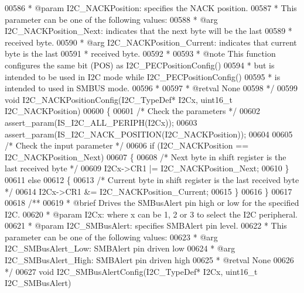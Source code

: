 \begin{DoxyCode}
00586 \textcolor{comment}{  * @param  I2C\_NACKPosition: specifies the NACK position. }
00587 \textcolor{comment}{  *          This parameter can be one of the following values:}
00588 \textcolor{comment}{  *            @arg I2C\_NACKPosition\_Next: indicates that the next byte will be the last}
00589 \textcolor{comment}{  *                                        received byte.  }
00590 \textcolor{comment}{  *            @arg I2C\_NACKPosition\_Current: indicates that current byte is the last }
00591 \textcolor{comment}{  *                                           received byte.}
00592 \textcolor{comment}{  *            }
00593 \textcolor{comment}{  * @note    This function configures the same bit (POS) as I2C\_PECPositionConfig() }
00594 \textcolor{comment}{  *          but is intended to be used in I2C mode while I2C\_PECPositionConfig() }
00595 \textcolor{comment}{  *          is intended to used in SMBUS mode. }
00596 \textcolor{comment}{  *            }
00597 \textcolor{comment}{  * @retval None}
00598 \textcolor{comment}{  */}
00599 \textcolor{keywordtype}{void} I2C_NACKPositionConfig(I2C\_TypeDef* I2Cx, uint16\_t I2C\_NACKPosition)
00600 \{
00601   \textcolor{comment}{/* Check the parameters */}
00602   assert_param(IS\_I2C\_ALL\_PERIPH(I2Cx));
00603   assert_param(IS\_I2C\_NACK\_POSITION(I2C\_NACKPosition));
00604 
00605   \textcolor{comment}{/* Check the input parameter */}
00606   \textcolor{keywordflow}{if} (I2C\_NACKPosition == I2C_NACKPosition_Next)
00607   \{
00608     \textcolor{comment}{/* Next byte in shift register is the last received byte */}
00609     I2Cx->CR1 |= I2C_NACKPosition_Next;
00610   \}
00611   \textcolor{keywordflow}{else}
00612   \{
00613     \textcolor{comment}{/* Current byte in shift register is the last received byte */}
00614     I2Cx->CR1 &= I2C_NACKPosition_Current;
00615   \}
00616 \}
00617 
00618 \textcolor{comment}{/**}
00619 \textcolor{comment}{  * @brief  Drives the SMBusAlert pin high or low for the specified I2C.}
00620 \textcolor{comment}{  * @param  I2Cx: where x can be 1, 2 or 3 to select the I2C peripheral.}
00621 \textcolor{comment}{  * @param  I2C\_SMBusAlert: specifies SMBAlert pin level. }
00622 \textcolor{comment}{  *          This parameter can be one of the following values:}
00623 \textcolor{comment}{  *            @arg I2C\_SMBusAlert\_Low: SMBAlert pin driven low}
00624 \textcolor{comment}{  *            @arg I2C\_SMBusAlert\_High: SMBAlert pin driven high}
00625 \textcolor{comment}{  * @retval None}
00626 \textcolor{comment}{  */}
00627 \textcolor{keywordtype}{void} I2C_SMBusAlertConfig(I2C\_TypeDef* I2Cx, uint16\_t I2C\_SMBusAlert)

\end{DoxyCode}
